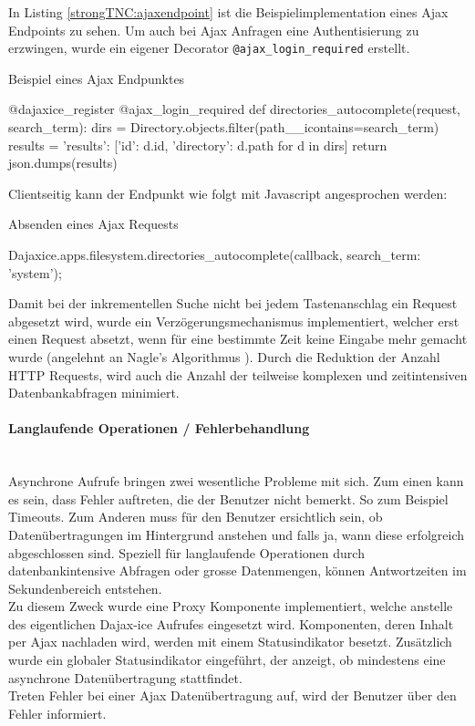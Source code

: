In Listing \ref{strongTNC:ajaxendpoint} ist die Beispielimplementation eines Ajax Endpoints zu sehen. Um auch bei Ajax Anfragen eine Authentisierung zu erzwingen, wurde ein eigener Decorator \texttt{@ajax\_login\_required} erstellt. 

\begin{listing}[H]
\caption{Beispiel eines Ajax Endpunktes}
\label{strongTNC:ajaxendpoint}
\begin{pythoncode}
@dajaxice_register
@ajax_login_required
def directories_autocomplete(request, search_term):
    dirs = Directory.objects.filter(path__icontains=search_term)
    results = {'results': [{'id': d.id, 'directory': d.path} for d in dirs]}
    return json.dumps(results)
\end{pythoncode}
\end{listing}

Clientseitig kann der Endpunkt wie folgt mit Javascript angesprochen werden:
\begin{listing}
\caption{Absenden eines Ajax Requests}
\begin{jscode}
Dajaxice.apps.filesystem.directories_autocomplete(callback, {search_term: 'system'});
\end{jscode} 
\end{listing}

Damit bei der inkrementellen Suche nicht bei jedem Tastenanschlag ein Request
abgesetzt wird, wurde ein Verzögerungsmechanismus implementiert, welcher erst einen Request
absetzt, wenn für eine bestimmte Zeit keine Eingabe mehr gemacht wurde (angelehnt an Nagle's Algorithmus \cite{nagle1984congestion}).
Durch die Reduktion der Anzahl HTTP Requests, wird auch die Anzahl der teilweise komplexen und zeitintensiven Datenbankabfragen minimiert.

\paragraph{Langlaufende Operationen / Fehlerbehandlung}\hspace{0pt}\\
Asynchrone Aufrufe bringen zwei wesentliche Probleme mit sich. Zum einen kann es
sein, dass Fehler auftreten, die der Benutzer nicht bemerkt. So zum Beispiel Timeouts.
Zum Anderen muss für den Benutzer ersichtlich sein, ob Datenübertragungen im
Hintergrund anstehen und falls ja, wann diese erfolgreich abgeschlossen sind.
Speziell für langlaufende Operationen durch datenbankintensive Abfragen oder
grosse Datenmengen, können Antwortzeiten im Sekundenbereich entstehen. \\
Zu diesem Zweck wurde eine Proxy Komponente \cite{gamma1994design}
implementiert, welche anstelle des eigentlichen Dajax-ice Aufrufes eingesetzt
wird. Komponenten, deren Inhalt per Ajax nachladen wird, werden mit
einem Statusindikator besetzt. Zusätzlich wurde ein globaler Statusindikator
eingeführt, der anzeigt, ob mindestens eine asynchrone Datenübertragung
stattfindet.\\
Treten Fehler bei einer Ajax Datenübertragung auf, wird der Benutzer über den Fehler informiert.

